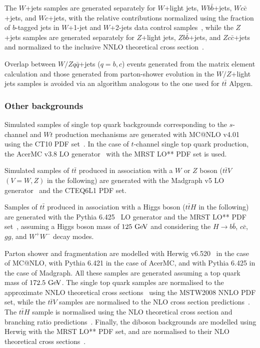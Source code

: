 The $W$+jets samples are generated separately for $W$+light jets, 
$Wb\bar{b}$+jets, $Wc\bar{c}$+jets, and $Wc$+jets, 
with the relative contributions normalized using the fraction 
of $b$-tagged jets in $W$+1-jet and $W$+2-jets data 
control samples~\cite{whf}, while
the $Z$+jets samples are generated separately 
for $Z$+light jets, $Zb\bar{b}$+jets, and $Zc\bar{c}$+jets and
normalized to the inclusive NNLO theoretical cross section~\cite{vjetsxs}.

Overlap between $W/Zq\bar{q}$+jets ($q=b,c$) 
events generated from the matrix element calculation and those
generated from parton-shower evolution in the $W/Z$+light jets
samples is avoided via an algorithm analogous to the one used
for $t\bar{t}$ Alpgen.


\subsubsection{Other backgrounds}\label{subsec:otherbkg}
Simulated samples of single top quark backgrounds corresponding to the
$s$-channel and $Wt$ production mechanisms are generated with {\sc
MC@NLO} v4.01~\cite{mcatnlo_1,mcatnlo_2,mcatnlo_3} using the {\sc
CT10} PDF set~\cite{ct10}.  In the case of $t$-channel single top
quark production, the {\sc AcerMC} v3.8 LO generator~\cite{acermc}
with the {\sc MRST LO**} PDF set is used.

Simulated samples of $t\bar{t}$ produced in association with a $W$ or $Z$ boson
($t\bar{t}V$ $(V=W,Z)$ in the following) are generated with the {\sc Madgraph v5} LO
generator~\cite{madgraph} and the {\sc CTEQ6L1} PDF set.  

Samples of $t\bar{t}$ produced in association with a Higgs boson
($t\bar{t}H$ in the following) are generated with the 
{\sc Pythia} 6.425~\cite{py6} LO generator and the {\sc MRST LO**} PDF set~\cite{mrst},
assuming a Higgs boson mass of $125\gev$ and considering the 
$H\to b\bar{b}$, $c\bar{c}$, $gg$, and $W^+W^-$ decay modes.

Parton shower and fragmentation are modelled with {\sc Herwig}
v6.520~\cite{herwig} in the case of {\sc MC@NLO}, with {\sc Pythia}
6.421 in the case of {\sc AcerMC}, and with {\sc Pythia} 6.425 in the
case of {\sc Madgraph}.  All these samples are generated assuming a top
quark mass of $172.5\gev$. The single top quark samples are normalised to
the approximate NNLO theoretical cross sections~\cite{stopxs,stopxs_2}
using the {\sc MSTW2008} NNLO PDF set, while the $t\bar{t}V$ samples
are normalised to the NLO cross section predictions~\cite{ttbarVxs1,ttbarVxs2}.
The $t\bar{t}H$ sample is normalised using the NLO theoretical cross section 
and branching ratio predictions~\cite{lhcxs}.
Finally, the diboson backgrounds are modelled using {\sc Herwig} with
the {\sc MRST LO**} PDF set, and are normalised to their NLO
theoretical cross sections~\cite{dibosonxs}.

